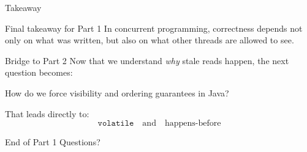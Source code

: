 \documentclass[aspectratio=169,11pt]{beamer}
\begin{document}
	\begin{frame}{Takeaway}
		\begin{alertblock}{Final takeaway for Part 1}
			In concurrent programming, correctness depends not only on what was written, but also on what other threads are allowed to see.
		\end{alertblock}
		
		\vspace{0.35cm}
		
		\begin{block}{Bridge to Part 2}
			Now that we understand \emph{why} stale reads happen, the next question becomes:
			
			\begin{center}
				\Large
				How do we force visibility and ordering guarantees in Java?
			\end{center}
		\end{block}
		
		\vspace{0.25cm}
		
		That leads directly to:
		\[
		\texttt{volatile} \quad \text{and} \quad \text{happens-before}
		\]
	\end{frame}
	
	\begin{frame}{End of Part 1}
		\centering
		\Huge Questions?
	\end{frame}
	
\end{document}
